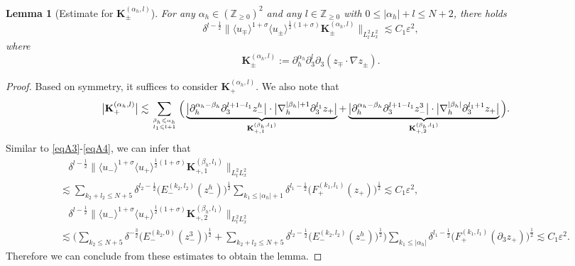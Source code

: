\documentclass[10pt,reqno]{amsart}
\numberwithin{equation}{section}
\newtheorem{lemma}[theorem]{Lemma}
\begin{document}
\begin{lemma}[Estimate for $\mathbf{K}_\pm^{(\alpha_h,l)}$]\label{lemma3}
	For any $\alpha_h\in(\mathbb{Z}_{\geqslant 0})^2$ and any $l\in\mathbb{Z}_{\geqslant 0}$ with $0\leqslant|\alpha_h|+l\leqslant N+2$, 
	there holds
	\[\delta^{l-\frac{1}{2}}\big\|\langle u_\mp\rangle^{1+\sigma}\langle u_\pm\rangle^{\frac{1}{2}(1+\sigma)}\mathbf{K}_\pm^{(\alpha_h,l)}\big\|_{L^2_tL^2_x}
	\lesssim C_1\varepsilon^2,\]
	where 
	\[\mathbf{K}_\pm^{(\alpha_h,l)}:=\partial_h^{\alpha_h}\partial_3^{l}\partial_3(z_\mp\cdot \nabla z_\pm).\]
\end{lemma}
\begin{proof}
	Based on symmetry, it suffices to consider $\mathbf{K}_{+}^{(\alpha_h,l)}$. We also note that 
		\begin{align*} \big|\mathbf{K}_+^{(\alpha_h,l)}\big|
		&\lesssim\sum_{\beta_h\leqslant\alpha_h\atop l_1\leqslant l+1}\Big(\underbrace{\big|\partial_h^{\alpha_h-\beta_h}\partial_3^{l+1-l_1}z_-^h\big|\cdot \big|\nabla_h^{|\beta_h|+1}\partial_3^{l_1} z_{+}\big|}_{\mathbf{K}_{+,1}^{(\beta_h,l_1)}}+\underbrace{\big|\partial_h^{\alpha_h-\beta_h}\partial_3^{l+1-l_1}z_-^3\big|\cdot \big|\nabla_h^{|\beta_h|}\partial_3^{l_1+1} z_{+}\big|}_{\mathbf{K}_{+,2}^{(\beta_h,l_1)}}\Big).
	\end{align*}
Similar to \eqref{eqA3}-\eqref{eqA4}, we can infer that 
	\begin{align*}
	&\ \ \ \ \delta^{l-\frac{1}{2}}	\big\|\langle u_-\rangle^{1+\sigma}\langle u_+\rangle^{\frac{1}{2}(1+\sigma)}\mathbf{K}_{+,1}^{(\beta_h,l_1)}\big\|_{L^2_tL^2_x}\\
	&\lesssim \sum_{k_2+l_2\leqslant N+5}\delta^{l_2-\frac{1}{2}} \big(E_-^{(k_2,l_2)}(z_-^h)\big)^{\frac{1}{2}}\sum_{k_1\leqslant|\alpha_h|+1}\delta^{l_1-\frac{1}{2}} \big(F_+^{(k_1,l_1)}(z_+)\big)^{\frac{1}{2}}
	\lesssim C_1\varepsilon^2,\\
	&\ \ \ \ 	\delta^{l-\frac{1}{2}}\big\|\langle u_-\rangle^{1+\sigma}\langle u_+\rangle^{\frac{1}{2}(1+\sigma)}\mathbf{K}_{+,2}^{(\beta_h,l_1)}\big\|_{L^2_tL^2_x}\\
	&\lesssim\Big(\sum_{k_2\leqslant N+5}\delta^{-\frac{3}{2}} \big(E_-^{(k_2,0)}(z_-^3)\big)^{\frac{1}{2}}+\sum_{k_2+l_2\leqslant N+5}\delta^{l_2-\frac{1}{2}} \big(E_-^{(k_2,l_2)}(z_-^h)\big)^{\frac{1}{2}}\Big)\sum_{k_1\leqslant|\alpha_h|}\delta^{l_1-\frac{1}{2}} \big(F_+^{(k_1,l_1)}(\partial_3z_+)\big)^{\frac{1}{2}}
	\lesssim  C_1\varepsilon^2.
\end{align*}
Therefore we can conclude from these estimates to obtain the lemma. 
\end{proof}
\end{document}
